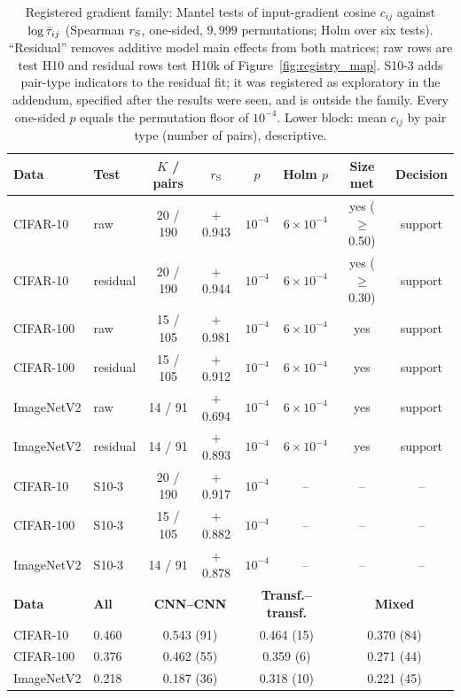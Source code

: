 \begin{table}[!t]
\centering
\caption{Registered gradient family: Mantel tests of input-gradient cosine $c_{ij}$ against $\log\bar{\tau}_{ij}$ (Spearman $r_{\mathrm{S}}$, one-sided, $9{,}999$ permutations; Holm over six tests). ``Residual'' removes additive model main effects from both matrices; raw rows are test H10 and residual rows test H10k of Figure~\ref{fig:registry_map}. S10-3 adds pair-type indicators to the residual fit; it was registered as exploratory in the addendum, specified after the results were seen, and is outside the family. Every one-sided $p$ equals the permutation floor of $10^{-4}$. Lower block: mean $c_{ij}$ by pair type (number of pairs), descriptive.}
\label{tab:mantel}
\scriptsize
\setlength{\tabcolsep}{1.5pt}
\begin{tabular}{llcccccc}
\toprule
\textbf{Data} & \textbf{Test} & \textbf{$K$ / pairs} & \textbf{$r_{\mathrm{S}}$} & \textbf{$p$} & \textbf{Holm $p$} & \textbf{Size met} & \textbf{Decision} \\
\midrule
CIFAR-10 & raw & 20 / 190 & $+$0.943 & $10^{-4}$ & $6\times10^{-4}$ & yes ($\geq$0.50) & support \\
CIFAR-10 & residual & 20 / 190 & $+$0.944 & $10^{-4}$ & $6\times10^{-4}$ & yes ($\geq$0.30) & support \\
CIFAR-100 & raw & 15 / 105 & $+$0.981 & $10^{-4}$ & $6\times10^{-4}$ & yes & support \\
CIFAR-100 & residual & 15 / 105 & $+$0.912 & $10^{-4}$ & $6\times10^{-4}$ & yes & support \\
ImageNetV2 & raw & 14 / 91 & $+$0.694 & $10^{-4}$ & $6\times10^{-4}$ & yes & support \\
ImageNetV2 & residual & 14 / 91 & $+$0.893 & $10^{-4}$ & $6\times10^{-4}$ & yes & support \\
CIFAR-10 & S10-3 & 20 / 190 & $+$0.917 & $10^{-4}$ & -- & -- & -- \\
CIFAR-100 & S10-3 & 15 / 105 & $+$0.882 & $10^{-4}$ & -- & -- & -- \\
ImageNetV2 & S10-3 & 14 / 91 & $+$0.878 & $10^{-4}$ & -- & -- & -- \\
\midrule
\textbf{Data} & \textbf{All} & \multicolumn{2}{c}{\textbf{CNN--CNN}} & \multicolumn{2}{c}{\textbf{Transf.--transf.}} & \multicolumn{2}{c}{\textbf{Mixed}} \\
\midrule
CIFAR-10 & 0.460 & \multicolumn{2}{c}{0.543 (91)} & \multicolumn{2}{c}{0.464 (15)} & \multicolumn{2}{c}{0.370 (84)} \\
CIFAR-100 & 0.376 & \multicolumn{2}{c}{0.462 (55)} & \multicolumn{2}{c}{0.359 (6)} & \multicolumn{2}{c}{0.271 (44)} \\
ImageNetV2 & 0.218 & \multicolumn{2}{c}{0.187 (36)} & \multicolumn{2}{c}{0.318 (10)} & \multicolumn{2}{c}{0.221 (45)} \\
\bottomrule
\end{tabular}
\end{table}

